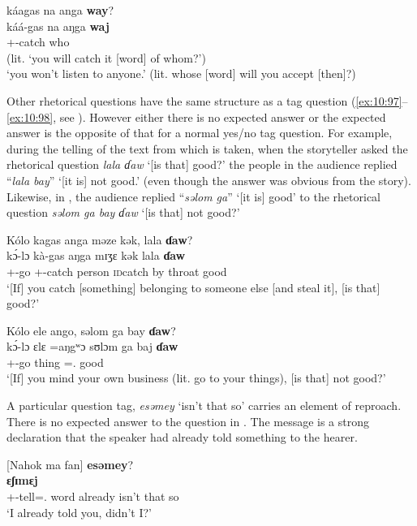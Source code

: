\clearpage
     \medskip
káagas  na  anga  \textbf{way}?\\
\gll káá-gas na aŋga \textbf{waj}\\
     {\twoS}+{\POT}-catch  {\PSP}  {\POSS} who\\
\glt (lit. ‘you will catch it [word] of whom?’) \\
\glt  ‘you won't listen to anyone.' (lit. whose [word] will you accept [then]?) 
\z 

Other rhetorical questions have the same structure as a tag question (\ref{ex:10:97}–\ref{ex:10:98}, see ). However either there is no expected answer or the expected answer is the opposite of that for a normal yes/no tag question. For example, during the telling of the text from which  is taken, when the storyteller asked the rhetorical question \textit{lala  ɗaw} ‘[is that] good?’ the people in the audience replied “\textit{lala bay}” ‘[it is] not good.’ (even though the answer was obvious from the story). Likewise, in , the audience replied “\textit{səlom ga}” ‘[it is] good’ to the rhetorical question \textit{səlom ga bay ɗaw} ‘[is that] not good?’

\ea \label{ex:10:97}
Kólo  kagas  anga  məze  kək,  lala  \textbf{ɗaw}?\\
\gll  k\'{ɔ}-lɔ  kà-gas    aŋga  mɪʒɛ  kək      lala  \textbf{ɗaw}\\
      {\twoS}+{\IFV}-go  {\twoS}+{\PFV}-catch  {\POSS}  person  {\textsc{id}catch by throat}    good  {\QUEST}\\
\glt  ‘[If] you catch [something] belonging to someone else [and steal it], [is that] good?’
\z 

\ea \label{ex:10:98}
Kólo  ele  ango,  səlom  ga  bay  \textbf{ɗaw}?\\
\gll  k\'{ɔ}-lɔ  ɛlɛ  =aŋgʷɔ    sʊlɔm  ga  baj  \textbf{ɗaw}\\
      {\twoS}+{\IFV}-go  thing  ={\twoS}.{\POSS}  good  {\ADJ}  {\NEG}  {\QUEST}\\
\glt  ‘[If] you mind your own business (lit. go to your things), [is that] not good?’
\z 

A particular question tag, \textit{esəmey} ‘isn’t that so’ carries an element of reproach. There is no expected answer to the question in . The message is a strong declaration that the speaker had already told something to the hearer. 

\ea \label{ex:10:99}
[Nahok ma  fan] \textbf{esəmey}?\\
\gll  [nà-h=ɔkʷ     ma  faŋ]  \textbf{ɛʃɪmɛj}\\
      {\oneS}+{\PFV}-tell={\twoS}.{\IO}  word  already  {isn’t that so}\\
\glt  ‘I already told you, didn’t I?’
\z 

